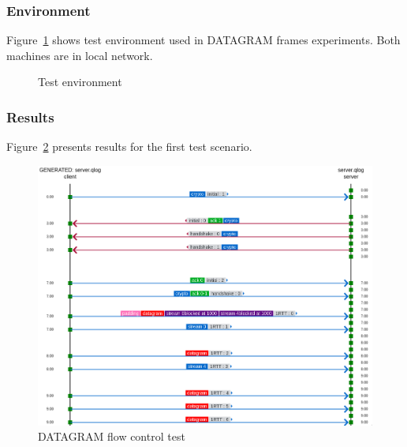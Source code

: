 \subsubsection{Environment}
\label{subsubsec:test-env}
Figure~\ref{fig:dgram_test_env} shows test environment used in DATAGRAM frames experiments.
Both machines are in local network.


\begin{figure}
    \centering
    \caption{Test environment}
    \label{fig:dgram_test_env}
\end{figure}

\subsubsection{Results}
Figure~\ref{fig:dgram_flow_control} presents results for the first test scenario.

\begin{figure}
    \centering
    \includegraphics[width=\textwidth]{img/__09__datagrams/dgram_flow_control.png}
    \caption{DATAGRAM flow control test}
    \label{fig:dgram_flow_control}
\end{figure}

